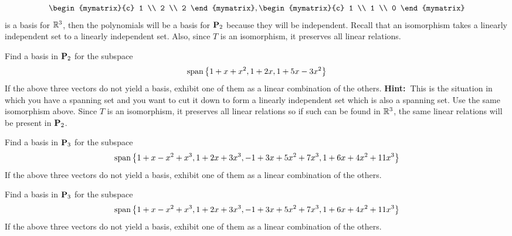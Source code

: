 \begin{ex}
\begin{equation*}
{\begin{mymatrix}{c}
        1 \\
        2 \\
        2
      \end{mymatrix} ,\begin{mymatrix}{c}
        1 \\
        1 \\
        0
      \end{mymatrix} }
  \end{equation*}
  is a basis for $\mathbb{R}^{3}$, then the polynomials will be a basis for
  $\mathbf{P}_{2}$ because they will be independent. Recall that an isomorphism
  takes a linearly independent set to a linearly independent set. Also, since
  $T$ is an isomorphism, it preserves all linear relations.
\end{ex}

\begin{ex}
  Find a basis in $\mathbf{P}_{2}$ for the subspace
  \begin{equation*}
    \sspan\set{1+x+x^{2},1+2x,1+5x-3x^{2}}
  \end{equation*}
  If the above three vectors do not yield a basis, exhibit one of them as a
  linear combination of the others. \textbf{Hint:\ }This is the situation in
  which you have a spanning set and you want to cut it down to form a linearly
  independent set which is also a spanning set. Use the same isomorphism
  above. Since $T$ is an isomorphism, it preserves all linear relations so if
  such can be found in $\mathbb{R}^{3}$, the same linear relations will be
  present in $\mathbf{P}_{2}$.
\end{ex}

\begin{ex}
  Find a basis in $\mathbf{P}_{3}$ for the subspace
  \begin{equation*}
    \sspan\set{
      1+x-x^{2}+x^{3},1+2x+3x^{3},-1+3x+5x^{2}+7x^{3},1+6x+4x^{2}+11x^{3}}
  \end{equation*}
  If the above three vectors do not yield a basis, exhibit one of them as a
  linear combination of the others.
\end{ex}

\begin{ex}
  Find a basis in $\mathbf{P}_{3}$ for the subspace
  \begin{equation*}
    \sspan\set{
      1+x-x^{2}+x^{3},1+2x+3x^{3},-1+3x+5x^{2}+7x^{3},1+6x+4x^{2}+11x^{3}}
  \end{equation*}
  If the above three vectors do not yield a basis, exhibit one of them as a
  linear combination of the others.
\end{ex}

